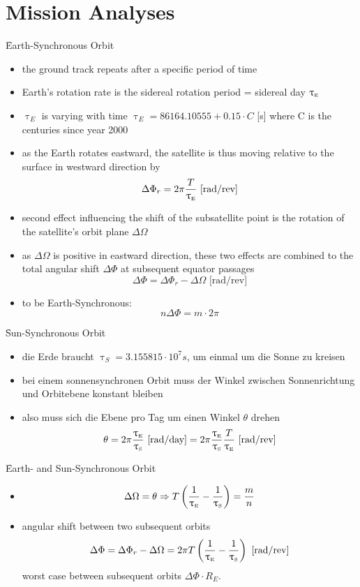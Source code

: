 \section{Mission Analyses}
\f{Earth-Synchronous Orbit}
\begin{itemize}
 \item the ground track repeats after a specific period of time
 \item Earth's rotation rate is the sidereal rotation period = sidereal day $\uptau_{\text{\tiny{E}}}$
 \item $\uptau_E$ is varying with time $\uptau_E = 86164.10555+0.15\cdot C$ [s] where C is the centuries since year 2000
 \item as the Earth rotates eastward, the satellite is thus moving relative to the surface in westward direction by 
 \[\Delta \Phi_r = 2\pi\frac{T}{\uptau_{\text{\tiny{E}}}} \text{ [rad/rev]}\] 
 \item second effect influencing the shift of the subsatellite point is the rotation of the satellite's orbit plane $\Delta \Omega$
 \item as $\Delta \Omega$ is positive in eastward direction, these two effects are combined to the total angular shift $\Delta \Phi$ at subsequent equator 
 passages \[\Delta \Phi = \Delta \Phi_r - \Delta \Omega \text{ [rad/rev]}\]
 \item to be Earth-Synchronous: 
 \[n\Delta \Phi = m \cdot 2\pi\]
\end{itemize}
\f{Sun-Synchronous Orbit}
\begin{itemize}
 \item die Erde braucht $\uptau_S = 3.155815\cdot 10^7 s$, um einmal um die Sonne zu kreisen 
 \item bei einem sonnensynchronen Orbit muss der Winkel zwischen Sonnenrichtung und Orbitebene konstant bleiben 
 \item also muss sich die Ebene pro Tag um einen Winkel $\theta$ drehen 
 \[\theta = 2\pi\frac{\uptau_{\text{\tiny{E}}}}{\uptau_{\text{\tiny{S}}}} \text{ [rad/day]} = 2\pi\frac{\uptau_{\text{\tiny{E}}}}{\uptau_{\text{\tiny{S}}}}\frac{T}{\uptau_{\text{\tiny{E}}}} \text{ [rad/rev]}\]
\end{itemize}
\f{Earth- and Sun-Synchronous Orbit}
\begin{itemize}
 \item \[\Delta \Omega = \theta \Rightarrow T\left(\frac{1}{\uptau_{\text{\tiny{E}}}} - \frac{1}{\uptau_{\text{\tiny{S}}}}\right) = \frac{m}{n}\]
 \item angular shift between two subsequent orbits 
 \[\Delta \Phi = \Delta \Phi_r - \Delta \Omega = 2\pi T\left(\frac{1}{\uptau_{\text{\tiny{E}}}} - \frac{1}{\uptau_{\text{\tiny{S}}}}\right) \text{ [rad/rev]}\]
 worst case between subsequent orbits $\Delta \Phi \cdot R_E$.
\end{itemize}
